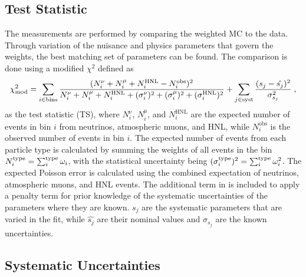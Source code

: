 \subsection{Test Statistic}

The measurements are performed by comparing the weighted MC to the data. Through variation of the nuisance and physics parameters that govern the weights, the best matching set of parameters can be found. The comparison is done using a modified $\chi^2$ defined as
\begin{equation}
    \small
    \chi^2_{\mathrm{mod}} = 
    \sum_{i \in \mathrm{bins}}^{}\frac{(N^{\mathrm{\nu}}_i + N^{\mathrm{\mu}}_i + N^{\mathrm{HNL}}_i - N^{\mathrm{obs}}_i)^2}
    {N^{\mathrm{\nu}}_i + N^{\mathrm{\mu}}_i + N^{\mathrm{HNL}}_i + (\sigma^{\mathrm{\nu}}_i)^2 + (\sigma^{\mathrm{\mu}}_i)^2 + (\sigma^{\mathrm{HNL}}_i)^2}
     + \sum_{j \in \mathrm{syst}}^{}\frac{(s_j - \hat{s_j})^2}{\sigma^2_{s_j}}
    \;,
    \labeq{mod-chi2-hnl}
\end{equation}
as the test statistic (TS), where $N^{\mathrm{\nu}}_i$, $N^{\mathrm{\mu}}_i$, and $N^{\mathrm{HNL}}_i$ are the expected number of events in bin $i$ from neutrinos, atmospheric muons, and HNL, while $N^{\mathrm{obs}}_i$ is the observed number of events in bin $i$. The expected number of events from each particle type is calculated by summing the weights of all events in the bin $N^{\mathrm{type}}_i = \sum_i^\rm{type}\omega_i$, with the statistical uncertainty being $(\sigma^{\mathrm{type}}_i)^2 = \sum_i^\rm{type}\omega_i^2$. The expected Poisson error is calculated using the combined expectation of neutrinos, atmospheric muons, and HNL events. The additional term in  is included to apply a penalty term for prior knowledge of the systematic uncertainties of the parameters where they are known. $s_j$ are the systematic parameters that are varied in the fit, while $\hat{s_j}$ are their nominal values and $\sigma_{s_j}$ are the known uncertainties.


\subsection{Systematic Uncertainties} 



